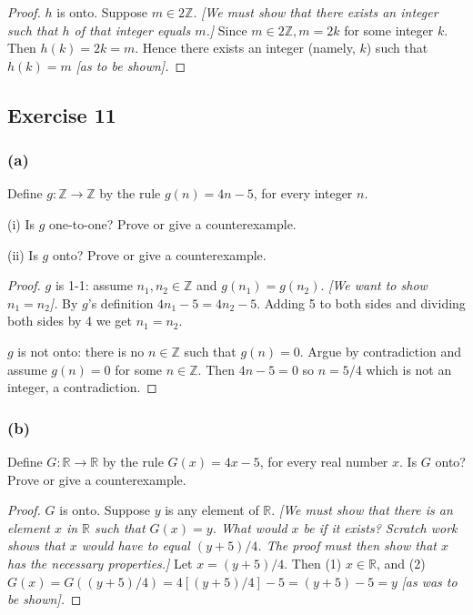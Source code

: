 \documentclass[14pt]{extarticle}
\newcommand{\R}{\mathbb{R}}
\newcommand{\Z}{\mathbb{Z}}
\begin{document}
\begin{proof}
$h$ is onto. Suppose \(m \in 2\Z\). {\it [We must show that there exists an integer such that $h$ of that integer 
equals $m$.]} Since \(m \in 2\Z, m = 2k\) for some integer $k$. Then \(h(k) = 2k = m\). Hence there exists an integer 
(namely, $k$) such that \(h(k) = m\) {\it [as to be shown].}
\end{proof}

\subsection{Exercise 11}
\subsubsection{(a)}
Define \(g: \Z \to \Z\) by the rule \(g(n) = 4n - 5\), for every integer $n$.

(i) Is $g$ one-to-one? Prove or give a counterexample.

(ii) Is $g$ onto? Prove or give a counterexample.

\begin{proof}
$g$ is 1-1: assume \(n_1, n_2 \in \Z\) and \(g(n_1) = g(n_2)\). {\it [We want to show \(n_1 = n_2\)].} By $g$'s
definition \(4n_1-5=4n_2-5\). Adding 5 to both sides and dividing both sides by 4 we get \(n_1 = n_2\).

$g$ is not onto: there is no $n \in \Z$ such that $g(n) = 0$. Argue by contradiction and assume \(g(n) = 0\) for some
\(n \in \Z\). Then \(4n-5 = 0\) so \(n = 5/4\) which is not an integer, a contradiction.
\end{proof}

\subsubsection{(b)}
Define \(G: \R \to \R\) by the rule \(G(x) = 4x - 5\), for every real number $x$. Is $G$ onto? Prove or give a counterexample.

\begin{proof}
$G$ is onto. Suppose $y$ is any element of $\R$. {\it [We must show that there is an element $x$ in $\R$ such that 
\(G(x) = y\). What would $x$ be if it exists? Scratch work shows that $x$ would have to equal \((y + 5)/4\). The proof 
must then show that $x$ has the necessary properties.]} Let \(x = (y + 5)/4\). Then (1) \(x \in \R\), and (2) \(G(x) = 
G((y + 5)/4) = 4[(y + 5)/4] - 5 = (y + 5) - 5 = y\) {\it [as was to be shown].}
\end{proof}
\end{document}
